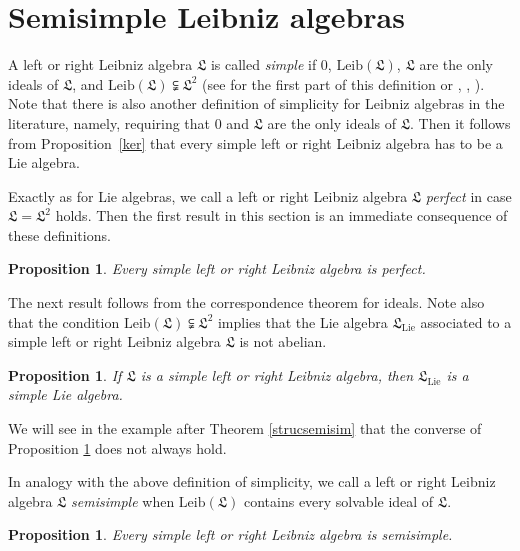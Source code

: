 \documentclass{amsart}
\newtheorem{pro}[thm]{Proposition}
\numberwithin{equation}{section}
\newcommand{\lie}{\mathrm{Lie}}
\newcommand{\leib}{\mathrm{Leib}}
\newcommand{\lf}{\mathfrak{L}}
\begin{document}

\section{Semisimple Leibniz algebras}


A left or right Leibniz algebra $\lf$ is called {\em simple\/} if $0$, $\leib(\lf)$, $\lf$ are the
only ideals of $\lf$, and $\leib(\lf)\subsetneqq\lf^2$ (see \cite[Definition 1]{DA} for the
first part of this definition or \cite[Definition 2.2]{ORT}, \cite[Definition 5.1]{DMS1},
\cite[Definition 2.6]{FM}). Note that there is also another definition of simplicity for Leibniz
algebras in the literature, namely, requiring that $0$ and $\lf$ are the only ideals of $\lf$.
Then it follows from Proposition~\ref{ker} that every simple left or right Leibniz algebra has
to be a Lie algebra.

Exactly as for Lie algebras, we call a left or right Leibniz algebra $\lf$ {\em perfect\/} in case
$\lf=\lf^2$ holds. Then the first result in this section is an immediate consequence of these
definitions.

\begin{pro}\label{simperfect}
Every simple left or right Leibniz algebra is perfect. 
\end{pro}

The next result follows from the correspondence theorem for ideals. Note also that the condition
$\leib(\lf)\subsetneqq\lf^2$ implies that the Lie algebra $\lf_\lie$ associated to a simple left or
right Leibniz algebra $\lf$ is not abelian. 

\begin{pro}\label{sim}
If $\lf$ is a simple left or right Leibniz algebra, then $\lf_\lie$ is a simple Lie algebra.
\end{pro}

\noindent We will see in the example after Theorem \ref{strucsemisim} that the converse of Proposition
\ref{sim} does not always hold.

In analogy with the above definition of simplicity, we call a left or right Leibniz algebra $\lf$ {\em
semisimple\/} when $\leib(\lf)$ contains every solvable ideal of $\lf$.

\begin{pro}\label{simsemisim}
Every simple left or right Leibniz algebra is semisimple.
\end{pro}
\end{document}

